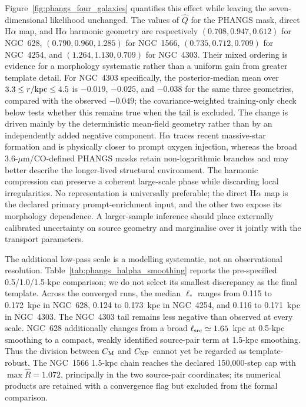 \documentclass[fleqn,usenatbib]{mnras}
\begin{document}
Figure~\ref{fig:phangs_four_galaxies} quantifies this effect while leaving the seven-dimensional likelihood unchanged.  The values of $\widehat Q$ for the PHANGS mask, direct H$\alpha$ map, and H$\alpha$ harmonic geometry are respectively $(0.708,0.947,0.612)$ for NGC~628, $(0.790,0.960,1.285)$ for NGC~1566, $(0.735,0.712,0.709)$ for NGC~4254, and $(1.264,1.130,0.709)$ for NGC~4303.  Their mixed ordering is evidence for a morphology systematic rather than a uniform gain from greater template detail.  For NGC~4303 specifically, the posterior-median mean over $3.3\leq r/{\rm kpc}\leq4.5$ is $-0.019$, $-0.025$, and $-0.038$ for the same three geometries, compared with the observed $-0.049$; the covariance-weighted training-only check below tests whether this remains true when the tail is excluded.  The change is driven mainly by the deterministic mean-field geometry rather than by an independently added negative component.  H$\alpha$ traces recent massive-star formation and is physically closer to prompt oxygen injection, whereas the broad 3.6-$\mu\mathrm{m}$/CO-defined PHANGS masks retain non-logarithmic branches and may better describe the longer-lived structural environment.  The harmonic compression can preserve a coherent large-scale phase while discarding local irregularities.  No representation is universally preferable; the direct H$\alpha$ map is the declared primary prompt-enrichment input, and the other two expose its morphology dependence.  A larger-sample inference should place externally calibrated uncertainty on source geometry and marginalise over it jointly with the transport parameters.

The additional low-pass scale is a modelling systematic, not an observational resolution.  Table~\ref{tab:phangs_halpha_smoothing} reports the pre-specified 0.5/1.0/1.5-kpc comparison; we do not select its smallest discrepancy as the final template.  Across the converged runs, the median $\ell_\ast$ ranges from 0.115 to 0.172~kpc in NGC~628, 0.124 to 0.173~kpc in NGC~4254, and 0.116 to 0.171~kpc in NGC~4303.  The NGC~4303 tail remains less negative than observed at every scale.  NGC~628 additionally changes from a broad $\ell_{\rm src}\simeq1.65$~kpc at 0.5-kpc smoothing to a compact, weakly identified source-pair term at 1.5-kpc smoothing.  Thus the division between $C_{\rm M}$ and $C_{\rm NP}$ cannot yet be regarded as template-robust.  The NGC~1566 1.5-kpc chain reaches the declared 150,000-step cap with $\max\widehat R=1.072$, principally in the two source-pair coordinates; its numerical products are retained with a convergence flag but excluded from the formal comparison.
\end{document}
